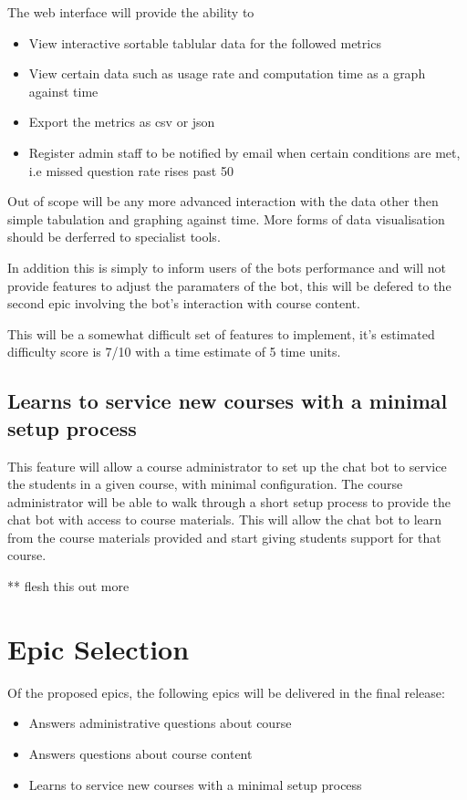 \documentclass{article}
\begin{document}
The web interface will provide the ability to 
\begin{itemize}
  \item View interactive sortable tablular data for the followed metrics
  \item View certain data such as usage rate and computation time as a graph against time
  \item Export the metrics as csv or json
  \item Register admin staff to be notified by email when certain conditions are met, i.e missed question rate rises past 50%
\end{itemize}

Out of scope will be any more advanced interaction with the data other then simple tabulation and graphing against time. More forms of data visualisation should be derferred to specialist tools. 

In addition this is simply to inform users of the bots performance and will not provide features to adjust the paramaters of the bot, this will be defered to the second epic involving the bot's interaction with course content. 

This will be a somewhat difficult set of features to implement, it's estimated difficulty score is 7/10 with a time estimate of 5 time units.

\subsection{Learns to service new courses with a minimal setup process}

This feature will allow a course administrator to set up the chat bot to service the students in a given course, with minimal configuration.
The course administrator will be able to walk through a short setup process to provide the chat bot with access to course materials.
This will allow the chat bot to learn from the course materials provided and start giving students support for that course. 

** flesh this out more


\section{Epic Selection}

Of the proposed epics, the following epics will be delivered in the final release:
\begin{itemize}
  \item Answers administrative questions about course
  \item Answers questions about course content
  \item Learns to service new courses with a minimal setup process
\end{itemize}
\end{document}
